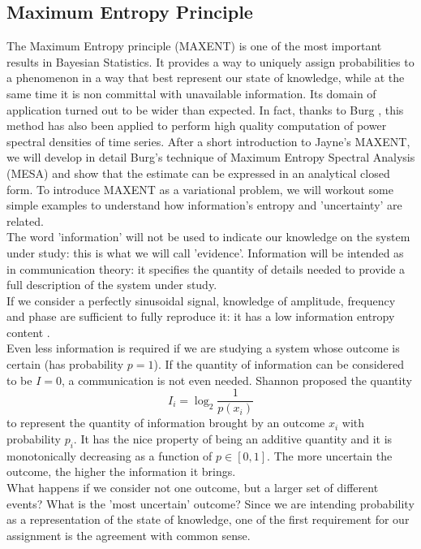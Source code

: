 \documentclass[twocolumn,showpacs,preprintnumbers,nofootinbib,prd,
superscriptaddress,10pt]{revtex4-1}
\begin{document}
\subsection{Maximum Entropy Principle} 
The Maximum Entropy principle (MAXENT) is one of the most important results in Bayesian Statistics. It provides a way to uniquely assign probabilities to a phenomenon in a way that best represent our state of knowledge, while at the same time it is non committal with unavailable information. Its domain of application turned out to be wider than expected. In fact, thanks to Burg \cite{burg1975maximum}, this method has also been applied to perform high quality computation of power spectral densities of time series. After a short introduction to Jayne's MAXENT, we will develop in detail Burg's technique of Maximum Entropy Spectral Analysis (MESA) and show that the estimate can be expressed in an analytical closed form.
To introduce MAXENT as a variational problem, we will workout some simple examples to understand how information's entropy and 'uncertainty' are related. \\ 
The word 'information' will not be used to indicate our knowledge on the system under study: this is what we will call 'evidence'. Information will be intended as in communication theory: it specifies the quantity of details needed to provide a full description of the system under study. \\ 
If we consider a perfectly sinusoidal signal, knowledge of amplitude, frequency and phase are sufficient to fully reproduce it: it has a low information entropy content . \\ 
Even less information is required if we are studying a system whose outcome is certain (has probability $p = 1$).
If the quantity of information can be considered to be $I = 0$, a communication is not even needed.  
Shannon \cite{Shannon} proposed the quantity
\begin{equation}\label{eq:information}
    I_i = \log_2 \frac{1}{p(x_i)}
\end{equation}
to represent the quantity of information brought by an outcome $x_i$ with probability $p_i$. It has the nice property of being an additive quantity and it is monotonically decreasing as a function of $p \in [0, 1]$. The more uncertain the outcome, the higher the information it brings. \\ 
What happens if we consider not one outcome, but a larger set of different events? What is  the 'most uncertain' outcome?  Since we are intending probability as a representation of the state of knowledge, one of the first requirement for our assignment is the agreement with common sense. \\ 
\end{document}
